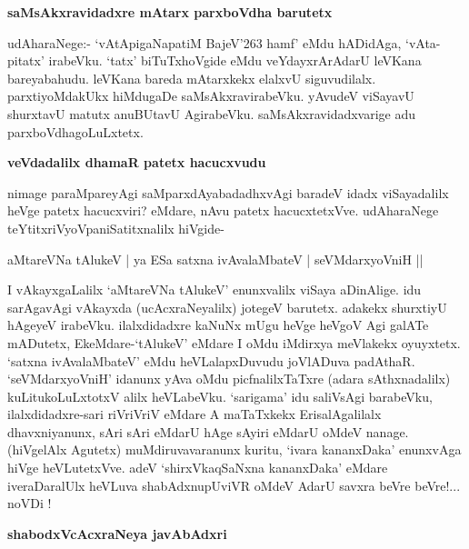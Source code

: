 {\bigskip
\noindent
{\large\bf saMsAkxravidadxre mAtarx parxboVdha barutetx}}\label{page124}
\medskip

\noindent
udAharaNege:- `vAtApigaNapatiM BajeV\char'263 hamf'\label{124} eMdu hADidAga, `vAta-pitatx' irabeVku. `tatx' biTuTx\-hoVgide eMdu veYdayxrArAdarU leVKana bareyabahudu. leVKana bareda mAtarxkekx elalxvU siguvudilalx. parxtiyoMdakUkx hiMdugaDe saMsAkxravirabeVku. yAvudeV viSayavU shurxtavU matutx anuBUtavU AgirabeVku. saMsAkxravidadxvarige adu parxboVdhagoLuLxtetx.

{\bigskip
\noindent
{\large\bf veVdadalilx dhamaR patetx hacucxvudu}}\label{page124}
\medskip

\noindent
nimage paraMpareyAgi saMparxdAyabadadhxvAgi baradeV idadx viSayadalilx heVge patetx hacucxviri? eMda\-re, nAvu patetx hacucxtetxVve. udAharaNege teYtitxriVyoVpaniSatitxnalilx hiVgide-

\begin{shloka}
aMtareVNa tAlukeV | ya ESa satxna ivAvalaMbateV | seVMdarxyoVniH ||\\\label{page124}
\end{shloka}

I vAkayxgaLalilx `aMtareVNa tAlukeV' enunxvalilx viSaya aDinAlige. idu sarAgavAgi vAkayxda (ucAcxraNe\-yalilx) jotegeV barutetx. adakekx shurxtiyU hAgeyeV irabeVku. ilalxdidadxre kaNuNx mUgu heVge heVgoV\- Agi galATe mADutetx, EkeMdare-`tAlukeV' eMdare I oMdu iMdirxya meVlakekx oyuyxtetx. `satxna ivAva\-laMbateV' eMdu heVLalapxDuvudu joVlADuva padAthaR. `seVMdarxyoVniH' idanunx yAva oMdu picf\-nalilxTaTxre (adara sAthxnadalilx) kuLitukoLuLxtotxV alilx heVLabeVku. `sarigama' idu saliVsAgi barabeVku, ilalxdidadxre-sari riVriVriV eMdare A maTaTxkekx ErisalAgalilalx dhavxniyanunx, sAri sAri eMdarU hAge sAyiri eMdarU oMdeV nanage. (hiVgelAlx Agutetx) muMdiruvavaranunx kuritu, `ivara kananxDaka' enunx\-vAga hiVge heVLutetxVve. adeV `shirxVkaqSaNxna kananxDaka' eMdare iveraDaralUlx heVLuva shabAdxnupUviVR oMdeV AdarU savxra beVre beVre!... noVDi !

{\bigskip
\noindent
{\large\bf shabodxVcAcxraNeya javAbAdxri}}\label{page124}
\medskip

